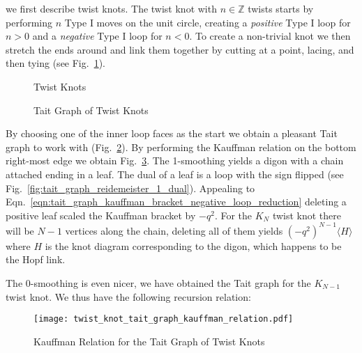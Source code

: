             we first describe twist knots. The twist knot with $n\in\mathbb{Z}$
            twists starts by performing $n$ Type I moves on the unit circle,
            creating a \textit{positive} Type I loop for $n>0$ and a
            \textit{negative} Type I loop for $n<0$. To create a non-trivial
            knot we then stretch the ends around and link them together by
            cutting at a point, lacing, and then tying
            (see Fig.~\ref{fig:twist_knot_001}).
            \begin{figure}
                \centering
                \caption{Twist Knots}
                \label{fig:twist_knot_001}
            \end{figure}
            \begin{figure}
                \centering
                \caption{Tait Graph of Twist Knots}
                \label{fig:twist_knot_tait_graph_001}
            \end{figure}
            By choosing one of the inner loop faces as the start we obtain a
            pleasant Tait graph to work with
            (Fig.~\ref{fig:twist_knot_tait_graph_001}). By performing the
            Kauffman relation on the bottom right-most edge we obtain
            Fig.~\ref{fig:twist_knot_tait_graph_kauffman_relation}. The
            1-smoothing yields a digon with a chain attached ending in a leaf.
            The dual of a leaf is a loop with the sign flipped
            (see Fig.~\ref{fig:tait_graph_reidemeister_1_dual}).
            Appealing to
            Eqn.~\ref{eqn:tait_graph_kauffman_bracket_negative_loop_reduction}
            deleting a positive leaf scaled the Kauffman bracket by
            $-q^{2}$. For the $K_{N}$ twist knot there will be
            $N-1$ vertices along the chain, deleting all of them yields
            $(-q^{2})^{N-1}\langle{H}\rangle$ where $H$ is the knot diagram
            corresponding to the digon, which happens to be the Hopf link.
            \par\hfill\par
            The 0-smoothing is even nicer, we have obtained the Tait graph for
            the $K_{N-1}$ twist knot. We thus have the following recursion
            relation:
            \begin{figure}
                \centering
                \texttt{[image: twist\_knot\_tait\_graph\_kauffman\_relation.pdf]}
                \caption{Kauffman Relation for the Tait Graph of Twist Knots}
                \label{fig:twist_knot_tait_graph_kauffman_relation}
            \end{figure}
